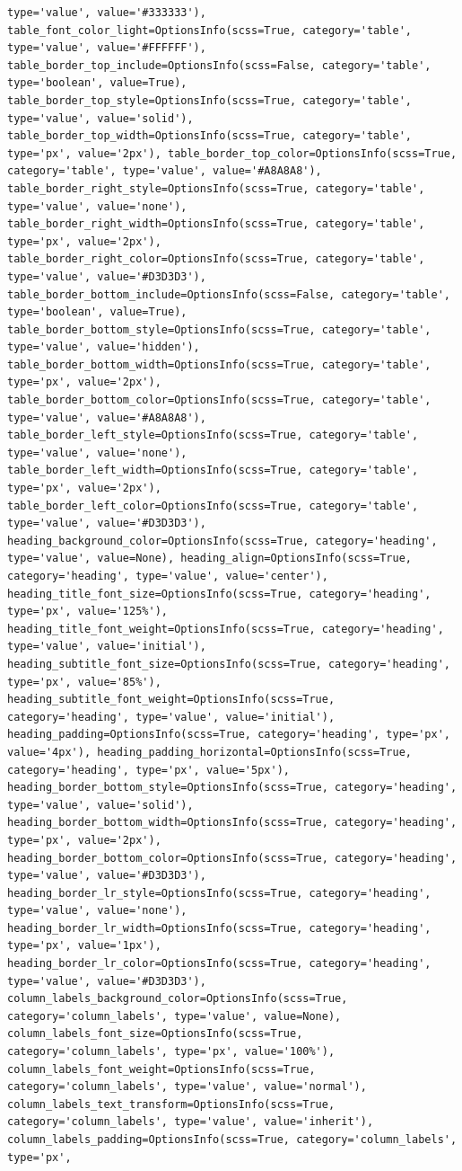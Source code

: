 \documentclass[
  letterpaper,
  DIV=11,
  numbers=noendperiod]{scrreprt}
\newcounter{none} %
\begin{document}
\begin{table}
{\begin{verbatim}
type='value', value='#333333'), table_font_color_light=OptionsInfo(scss=True, category='table', type='value', value='#FFFFFF'), table_border_top_include=OptionsInfo(scss=False, category='table', type='boolean', value=True), table_border_top_style=OptionsInfo(scss=True, category='table', type='value', value='solid'), table_border_top_width=OptionsInfo(scss=True, category='table', type='px', value='2px'), table_border_top_color=OptionsInfo(scss=True, category='table', type='value', value='#A8A8A8'), table_border_right_style=OptionsInfo(scss=True, category='table', type='value', value='none'), table_border_right_width=OptionsInfo(scss=True, category='table', type='px', value='2px'), table_border_right_color=OptionsInfo(scss=True, category='table', type='value', value='#D3D3D3'), table_border_bottom_include=OptionsInfo(scss=False, category='table', type='boolean', value=True), table_border_bottom_style=OptionsInfo(scss=True, category='table', type='value', value='hidden'), table_border_bottom_width=OptionsInfo(scss=True, category='table', type='px', value='2px'), table_border_bottom_color=OptionsInfo(scss=True, category='table', type='value', value='#A8A8A8'), table_border_left_style=OptionsInfo(scss=True, category='table', type='value', value='none'), table_border_left_width=OptionsInfo(scss=True, category='table', type='px', value='2px'), table_border_left_color=OptionsInfo(scss=True, category='table', type='value', value='#D3D3D3'), heading_background_color=OptionsInfo(scss=True, category='heading', type='value', value=None), heading_align=OptionsInfo(scss=True, category='heading', type='value', value='center'), heading_title_font_size=OptionsInfo(scss=True, category='heading', type='px', value='125%'), heading_title_font_weight=OptionsInfo(scss=True, category='heading', type='value', value='initial'), heading_subtitle_font_size=OptionsInfo(scss=True, category='heading', type='px', value='85%'), heading_subtitle_font_weight=OptionsInfo(scss=True, category='heading', type='value', value='initial'), heading_padding=OptionsInfo(scss=True, category='heading', type='px', value='4px'), heading_padding_horizontal=OptionsInfo(scss=True, category='heading', type='px', value='5px'), heading_border_bottom_style=OptionsInfo(scss=True, category='heading', type='value', value='solid'), heading_border_bottom_width=OptionsInfo(scss=True, category='heading', type='px', value='2px'), heading_border_bottom_color=OptionsInfo(scss=True, category='heading', type='value', value='#D3D3D3'), heading_border_lr_style=OptionsInfo(scss=True, category='heading', type='value', value='none'), heading_border_lr_width=OptionsInfo(scss=True, category='heading', type='px', value='1px'), heading_border_lr_color=OptionsInfo(scss=True, category='heading', type='value', value='#D3D3D3'), column_labels_background_color=OptionsInfo(scss=True, category='column_labels', type='value', value=None), column_labels_font_size=OptionsInfo(scss=True, category='column_labels', type='px', value='100%'), column_labels_font_weight=OptionsInfo(scss=True, category='column_labels', type='value', value='normal'), column_labels_text_transform=OptionsInfo(scss=True, category='column_labels', type='value', value='inherit'), column_labels_padding=OptionsInfo(scss=True, category='column_labels', type='px', 
\end{verbatim}}
\end{table}
\end{document}

